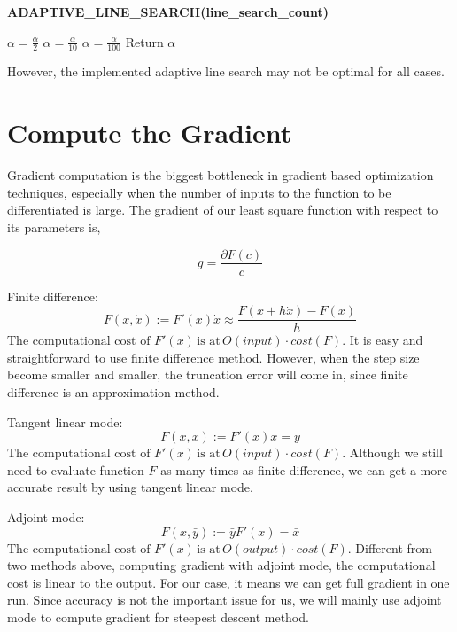 \documentclass[10pt,a4paper]{report}
\begin{document}
\begin{algorithm}[h]
\caption{\textbf{ADAPTIVE\_LINE\_SEARCH(line\_search\_count)}}
  \KwOut{$\alpha$}
  {  
  $\alpha=\frac{\alpha}{2}$
  }
  {
  $\alpha=\frac{\alpha}{10}$
  }
  \Else	
  {
  $\alpha=\frac{\alpha}{100}$
  }
  Return $\alpha$
\end{algorithm}

However, the implemented adaptive line search may not be optimal for all cases.

\section{Compute the Gradient}

Gradient computation is the biggest bottleneck in gradient based optimization techniques, especially when the number of inputs to the function to be differentiated is large. The gradient of our least square function with respect to its parameters is, 
 
\begin{equation}
g=\frac{\partial F(c)}{c}
\end{equation}       

Finite difference:
\begin{equation}
F(x,\dot{x}):=F'(x)\dot{x}\approx {\frac{F(x+h\dot{x})-F(x)}{h}}
\end{equation}
\[\]
$\text{The computational cost of }F'(x)\, \text{is at} \, O(input) \cdot cost(F)$.
It is easy and straightforward to use finite difference method. However, when the step size become smaller and smaller, the truncation error will come in, since finite difference is an approximation method. 

Tangent linear mode:
\begin{equation}
F(x,\dot{x}):=F'(x)\dot{x}=\dot{y}
\end{equation}
\[\]
$\text{The computational cost of }F'(x)\, \text{is at} \, O(input) \cdot cost(F)$. Although we still need to evaluate function $F$ as many times as finite difference, we can get a more accurate result by using tangent linear mode.

Adjoint mode:
\begin{equation}
F(x,\bar{y}):=\bar{y}F'(x)=\bar{x}
\end{equation}
\[\]
$\text{The computational cost of }F'(x)\, \text{is at} \, O(output) \cdot cost(F)$. Different from two methods above, computing gradient with adjoint mode, the computational cost is linear to the output. For our case, it means we can get full gradient in one run. Since accuracy is not the important issue for us, we will mainly use adjoint mode to compute gradient for steepest descent method. 
     
\end{document}
